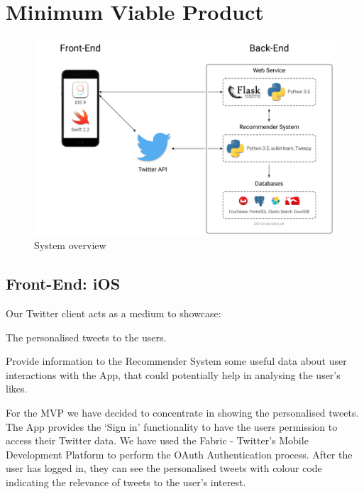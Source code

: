 \documentclass{article}
\begin{document}
\section{Minimum Viable Product}
% 
\begin{figure}[H]
    \centering
    \includegraphics[width=\textwidth]{system_overview}  
    \caption{System overview}
\end{figure}

\subsection{Front-End: iOS}
Our Twitter client acts as a medium to showcase:

\begin{itemize*}
	\item The personalised tweets to the users.
	\item Provide information to the Recommender System some useful data about user interactions with the App, that could potentially help in analysing the user's likes.
\end{itemize*}

\noindent For the MVP we have decided to concentrate in showing the personalised tweets.
The App provides the ‘Sign in’ functionality to have the users permission to access their 
Twitter data. We have used the Fabric - Twitter’s Mobile Development Platform to perform the OAuth Authentication process. After the user has logged in, they can see the personalised tweets with colour code indicating the relevance of tweets to the user's interest. 
\end{document}
